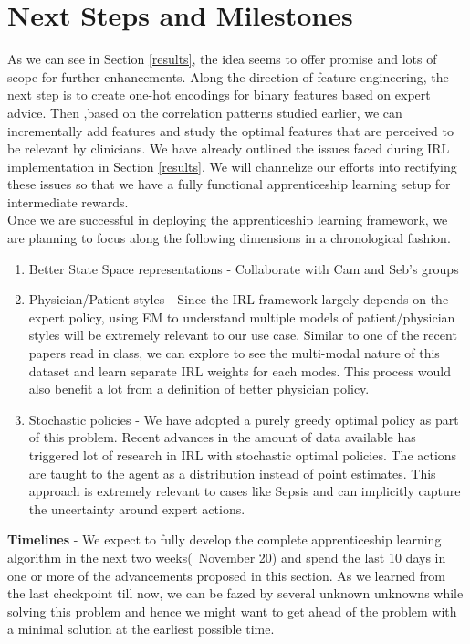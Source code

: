 \documentclass[twoside,11pt]{article}
\begin{document}
\section{Next Steps and Milestones}
As we can see in Section \ref{results}, the idea seems to offer promise and lots of scope for further enhancements. Along the direction of feature engineering, the next step is to create one-hot encodings for binary features based on expert advice. Then ,based on the correlation patterns studied earlier, we can incrementally add features and study the optimal features that are perceived to be relevant by clinicians. We have already outlined the issues faced during IRL implementation in Section \ref{results}. We will channelize our efforts into rectifying these issues so that we have a fully functional apprenticeship learning setup for intermediate rewards. \\[10pt]
Once we are successful in deploying the apprenticeship learning framework, we are planning to focus along the following dimensions in a chronological fashion.
\begin{enumerate}
\item Better State Space representations - Collaborate with Cam and Seb's groups
\item Physician/Patient styles - Since the IRL framework largely depends on the expert policy, using EM to understand multiple models of patient/physician styles will be extremely relevant to our use case. Similar to one of the recent papers read in class, we can explore to see the multi-modal nature of this dataset and learn separate IRL weights for each modes. This process would also benefit a lot from a definition of better physician policy.
\item Stochastic policies - We have adopted a purely greedy optimal policy as part of this problem. Recent advances in the amount of data available has triggered lot of research in IRL with stochastic optimal policies. The actions are taught to the agent as a distribution instead of point estimates. This approach is extremely relevant to cases like Sepsis and can implicitly capture the uncertainty around expert actions. 
\end{enumerate}
\textbf{Timelines} - We expect to fully develop the complete apprenticeship learning algorithm in the next two weeks(~November 20) and spend the last 10 days in one or more of the advancements proposed in this section. As we learned from the last checkpoint till now, we can be fazed by several unknown unknowns while solving this problem and hence we might want to get ahead of the problem with a minimal solution at the earliest possible time.
\end{document}

